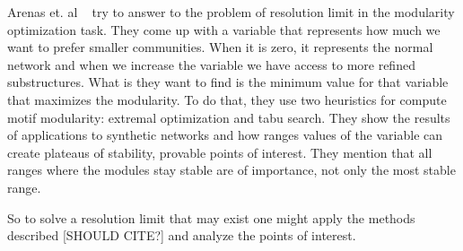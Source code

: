 Arenas et. al ~\cite{Arenas2008ResolutionLimit} try to answer to the problem of resolution limit in the modularity optimization task. They come up with a variable that represents how much we want to prefer smaller communities. When it is zero, it represents the normal network and when we increase the variable we have access to more refined substructures. What is they want to find is the minimum value for that variable that maximizes the modularity. To do that, they use two heuristics for compute motif modularity: extremal optimization and tabu search. They show the results of applications to synthetic networks and how ranges values of the variable can create plateaus of stability, provable points of interest. They mention that all ranges where the modules stay stable are of importance, not only the most stable range.

So to solve a resolution limit that may exist one might apply the methods described [SHOULD CITE?] and analyze the points of interest. 
